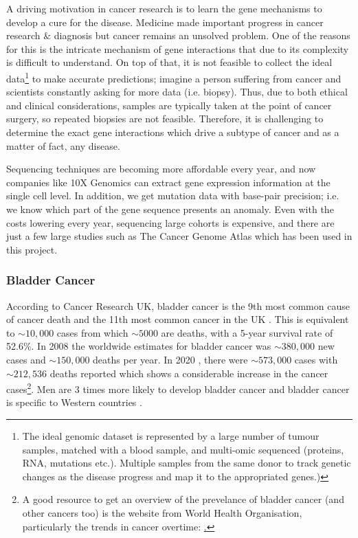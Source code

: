 A driving motivation in cancer research is to learn the gene mechanisms to develop a cure for the disease. Medicine made important progress in cancer research \& diagnosis but cancer remains an unsolved problem. One of the reasons for this is the intricate mechanism of gene interactions that due to its complexity is difficult to understand. On top of that, it is not feasible to collect the ideal data\footnote{The ideal genomic dataset is represented by a large number of tumour samples, matched with a blood sample, and multi-omic sequenced (proteins, RNA, mutations etc.). Multiple samples from the same donor to track genetic changes as the disease progress and map it to the appropriated genes.)} to make accurate predictions; imagine a person suffering from cancer and scientists constantly asking for more data (i.e. biopsy). Thus, due to both ethical and clinical considerations, samples are typically taken at the point of cancer surgery, so repeated biopsies are not feasible. Therefore, it is challenging to determine the exact gene interactions which drive a subtype of cancer and as a matter of fact, any disease. 

Sequencing techniques are becoming more affordable every year, and now companies like 10X Genomics can extract gene expression information at the single cell level. In addition, we get mutation data with base-pair precision; i.e. we know which part of the gene sequence presents an anomaly. Even with the costs lowering every year, sequencing large cohorts is expensive, and there are just a few large studies such as The Cancer Genome Atlas which has been used in this project.

\subsubsection{Bladder Cancer} \label{s:lit:bladder_cancer}

According to Cancer Research UK, bladder cancer is the 9th most common cause of cancer death and the 11th most common cancer in the UK \cite{Cancer_Research_UK2015-cf}. This is equivalent to $\sim10,000$ cases from which  $\sim5000$ are deaths, with a 5-year survival rate of 52.6\%. In 2008\cite{Ferlay2010-sx} the worldwide estimates for bladder cancer was $\sim380,000$ new cases and $\sim150,000$ deaths per year. In 2020\cite{Sung2021-hn} , there were $\sim573,000$ cases with $\sim212,536$ deaths reported which shows a considerable increase in the cancer cases\footnote{A good resource to get an overview of the prevelance of bladder cancer (and other cancers too) is the website from World Health Organisation, particularly the trends in cancer overtime: \href{https://gco.iarc.fr/en}.}. Men are 3 times more likely to develop bladder cancer and bladder cancer is specific to Western countries \cite{Knowles2015-mu}. 

